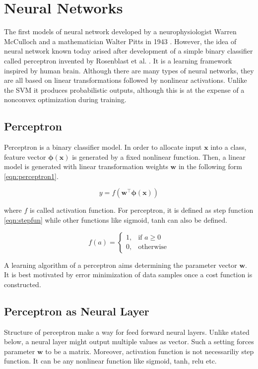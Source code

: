 \section{Neural Networks}
\label{sec:nnet}
The first models of neural network developed by a neurophysiologist Warren McCulloch and a mathematician Walter Pitts in 1943 \cite{mcculloch_logical_1943}. However, the idea of neural network known today arised after development of a simple binary classifier called perceptron invented by Rosenblast et al. \cite{rosenblatt_perceptron_1958}. It is a learning framework inspired by human brain.
Although there are many types of neural networks, they are all based on linear transformations followed by nonlinear activations.
Unlike the SVM it produces probabilistic outputs, although this
is at the expense of a nonconvex optimization during training.

\subsection{Perceptron}
Perceptron is a binary classifier model. In order to allocate input $\boldsymbol{x}$ into a class, feature vector $\boldsymbol{\phi}(\boldsymbol{x})$ is generated by a fixed nonlinear function. Then, a linear model is generated with linear transformation weights $\boldsymbol{w}$ in the following form \ref{eqn:perceptron1}.

\begin{equation}
\label{eqn:perceptron1}
y = f(\boldsymbol{w}^\intercal \boldsymbol{\phi}(\boldsymbol{x}))
\end{equation}

where $f$ is called activation function. For perceptron, it is defined as step function \ref{eqn:stepfun} while other functions like sigmoid, tanh can also be defined.

\begin{equation}
\label{eqn:stepfun}
f(a) = 
\begin{cases}
1,   & \text{if } a\geq 0\\
0,   & \text{otherwise}
\end{cases} 
\end{equation}

A learning algorithm of a perceptron aims determining the parameter vector $\boldsymbol{w}$. It is best motivated by error minimization of data samples once a cost function is constructed.

\subsection{Perceptron as Neural Layer}
Structure of perceptron make a way for feed forward neural layers. Unlike stated below, a neural layer might output multiple values as vector. Such a setting forces parameter $\boldsymbol{w}$ to be a matrix. Moreover, activation function is not necessariliy step function. It can be any nonlinear function like sigmoid, tanh, relu etc. 

